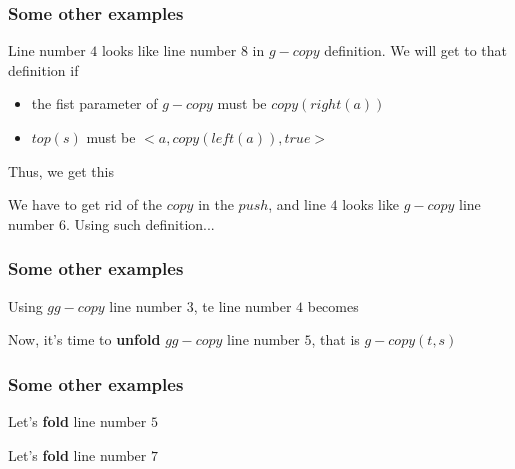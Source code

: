 \documentclass{beamer}
\begin{document}
\begin{frame}
	\frametitle{Some other examples}
	Line number $4$ looks like line number $8$ in $g-copy$ definition. We will get to that definition if
	\begin{itemize}
		\item the fist parameter of $g-copy$ must be $copy(right(a))$
		\item $top(s)$ must be $<a, copy(left(a)),true>$
	\end{itemize}
	Thus, we get this
	\begin{algorithmic}[1]
		\small
			\State{}
		\Else
			\State{}
		\EndIf
	\end{algorithmic}
	We have to get rid of the $copy$ in the $push$, and line $4$ looks like $g-copy$ line number $6$. Using such definition... 
\end{frame}
\begin{frame}
	\frametitle{Some other examples}
	\begin{algorithmic}[1]
		\small
			\State{}
		\Else
			\State{}
		\EndIf
	\end{algorithmic}
Using $gg-copy$ line number $3$, te line number $4$ becomes	
	\begin{algorithmic}[1]
		\small
			\State{}
		\Else
			\State{}
		\EndIf
	\end{algorithmic}
	Now, it's time to \textbf{unfold} $gg-copy$ line number $5$, that is $g-copy(t,s)$
\end{frame}
\begin{frame}
	\frametitle{Some other examples}
	\begin{algorithmic}[1]
		\tiny
			\State {}
		\Else
				\State{}
			\Else
				\State{}
			\EndIf
		\EndIf
	\end{algorithmic}
	Let's \textbf{fold} line number $5$ 
	\begin{algorithmic}[1]
		\tiny
			\State {}
		\Else
				\State{}
			\Else
				\State{}
			\EndIf
		\EndIf
	\end{algorithmic}
	Let's \textbf{fold} line number $7$
\end{frame}
\end{document}
